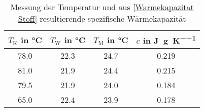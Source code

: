 \begin{table}[h]
\begin{center}
\begin{tabular}{c | c | c | c}
	$T_\text{K}$ in \si{\celsius} & $T_\text{W}$ in \si{\celsius} & $T_\text{M}$ in \si{\celsius} & $c$ in \si{\joule\per\gram\per\kelvin} \\
	\hline
	78.0 & 22.3 & 24.7 & 0.219 \\
	81.0 & 21.9 & 24.4 & 0.215 \\
	79.5 & 21.9 & 24.0 & 0.184 \\
	65.0 & 22.4 & 23.9 & 0.178 \\
\end{tabular}
	\caption{Messung der Temperatur und aus \eqref{Warmekapazitat Stoff} resultierende spezifische Wärmekapazität}
\end{center}
\end{table}